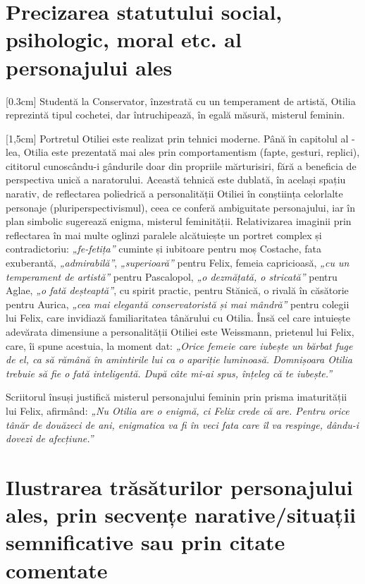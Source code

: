 \section{Precizarea statutului social, psihologic, moral etc. al personajului ales}

[0.3cm]
Studentă la Conservator, înzestrată cu un temperament de artistă, Otilia reprezintă tipul cochetei, dar întruchipează, în egală măsură, misterul feminin.

[1,5cm]
Portretul Otiliei este realizat prin tehnici moderne. Până în capitolul al -lea, Otilia este prezentată mai ales prin comportamentism (fapte, gesturi, replici), cititorul cunoscându-i gândurile doar din propriile mărturisiri, fără a beneficia de perspectiva unică a naratorului. Această tehnică este dublată, în același spațiu narativ, de reflectarea poliedrică a personalității Otiliei în conștiința celorlalte personaje (pluriperspectivismul), ceea ce conferă ambiguitate personajului, iar în plan simbolic sugerează enigma, misterul feminității. Relativizarea imaginii prin reflectarea în mai multe oglinzi paralele alcătuiește un portret complex și contradictoriu: \textit{„fe-fetița”} cuminte și iubitoare pentru moș Costache, fata exuberantă, \textit{„admirabilă”}, \textit{„superioară”} pentru Felix, femeia capricioasă, \textit{„cu un temperament de artistă”} pentru Pascalopol, \textit{„o dezmățată, o stricată”} pentru Aglae, \textit{„o fată deșteaptă”}, cu spirit practic, pentru Stănică, o rivală în căsătorie pentru Aurica, \textit{„cea mai elegantă conservatoristă și mai mândră”} pentru colegii lui Felix, care invidiază familiaritatea tânărului cu Otilia. Însă cel care intuiește adevărata dimensiune a personalității Otiliei este Weissmann, prietenul lui Felix, care, îi spune acestuia, la moment dat: \textit{„Orice femeie care iubește un bărbat fuge de el, ca să rămână în amintirile lui ca o apariție luminoasă. Domnișoara Otilia trebuie să fie o fată inteligentă. După câte mi-ai spus, înțeleg că te iubește.”}

Scriitorul însuși justifică misterul personajului feminin prin prisma imaturității lui Felix, afirmând: \textit{„Nu Otilia are o enigmă, ci Felix crede că are. Pentru orice tânăr de douăzeci de ani, enigmatica va fi în veci fata care îl va respinge, dându-i dovezi de afecțiune.”}


\section{Ilustrarea trăsăturilor personajului ales, prin secvențe narative/situații semnificative sau prin citate comentate}

